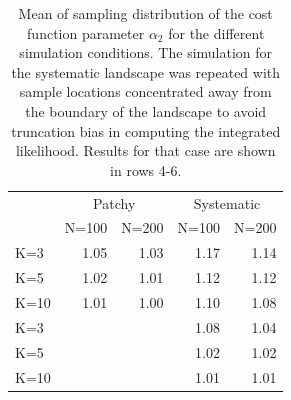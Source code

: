 \documentclass[12pt]{article}
\begin{document}
\begin{spacing}{1.2}
\begin{table}[ht]
\centering
\caption{
Mean of sampling distribution of the cost function parameter
$\alpha_{2}$ for the different simulation
conditions.  The simulation for the systematic landscape was repeated
with sample locations concentrated away from the boundary of the
landscape to avoid truncation bias in computing the integrated
likelihood. Results for that case are shown in rows 4-6.
}
\begin{tabular}{l|rrrr}
 & \multicolumn{2}{c}{Patchy} & \multicolumn{2}{c}{Systematic} \\
    & N=100 &  N=200  &   N=100 &  N=200  \\ \hline
K=3 &   1.05&    1.03 &     1.17 & 1.14 \\
K=5 &   1.02&    1.01 &     1.12 &1.12 \\
K=10&   1.01&    1.00 &     1.10 &1.08 \\ \hline
K=3    &       &         &     1.08 & 1.04 \\
K=5    &       &         &     1.02 & 1.02 \\
K=10    &       &         &     1.01 & 1.01 \\
\end{tabular}
\label{tab.results2}
\end{table}










\end{spacing}
\end{document}
